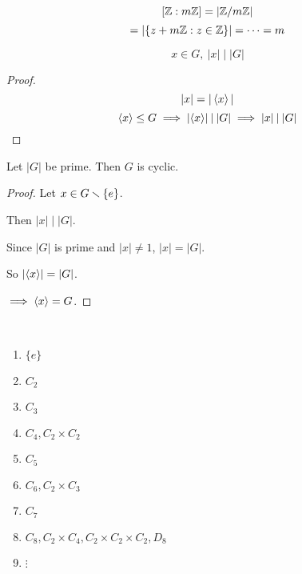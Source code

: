\documentclass[12pt]{article}
\newcommand{\order}[1]{\left\lvert#1\right\rvert}
\newcommand{\divides}{\mathbin|}
\newcommand\subgroup{\le}
\begin{document}
\bboxexam
\begin{exam}
    \[
        [\Z:m\Z]=\order{\Z/m\Z}
    \]
    \[
        =\order{ \{
                z + m\Z : z \in \Z
            \}
        }=\cdots=m
    \]
\end{exam}
\ebox

\bboxcoro
\begin{coro}
    \[
        x\in G,\ 
        \order{x} \divides \order{G}
    \]
\end{coro}
\ebox


\bboxproof
\begin{proof}
    \[
        |x|=|\left\langle x\right\rangle|
    \]
    \[
        \gen{x}\subgroup G\implies
        \order{\gen{x}}\divides\order{G}
        \implies \order{x}\divides\order{G}
    \]
\end{proof}
\ebox


\bboxcoro
\begin{coro}
    Let \(\order{G}\) be prime.
    Then \(G\) is cyclic.
\end{coro}
\ebox

\bboxproof
\begin{proof}
    Let \(x\in G\smallsetminus\{e\}\).

    Then \(\order{x}\divides\order{G}\).

    Since \(\order{G}\) is prime and
    \(|x|\neq 1\), \(\order{x}=\order{G}\).

    So \(\order{\gen{x}}=\order{G}\).

    \(\implies \left\langle x\right\rangle=G\).
\end{proof}
\ebox




\bboxnote
\begin{note}\ 
    \begin{enumerate}
        \item \(\{e\}\)
        \item \(C_2\)
        \item \(C_3\)
        \item \(C_4,C_2\times C_2\)
        \item \(C_5\)
        \item \(C_6,C_2\times C_3\)
        \item \(C_7\)
        \item \(C_8,C_2\times C_4,C_2\times C_2\times C_2, D_8\)
        \item \(\vdots\)
    \end{enumerate}
\end{note}
\ebox
\end{document}
